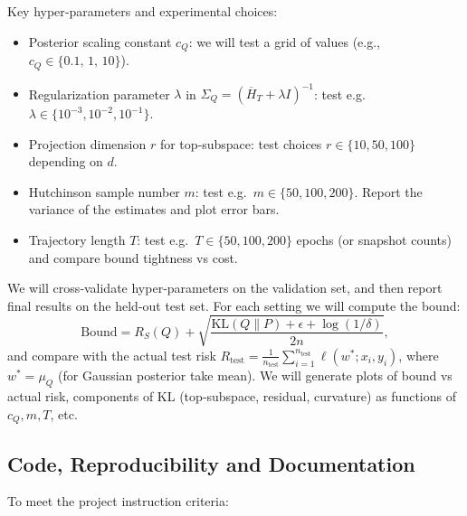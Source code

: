 Key hyper‐parameters and experimental choices:

\begin{itemize}[noitemsep]
  \item Posterior scaling constant \(c_Q\): we will test a grid of values (e.g., \(c_Q\in\{0.1,\,1,\,10\}\)).  
  \item Regularization parameter \(\lambda\) in \(\Sigma_Q=(\overline H_T+\lambda I)^{-1}\): test e.g.\ \(\lambda\in\{10^{-3},10^{-2},10^{-1}\}\).  
  \item Projection dimension \(r\) for top‐subspace: test choices \(r\in\{10,50,100\}\) depending on \(d\).  
  \item Hutchinson sample number \(m\): test e.g.\ \(m\in\{50,100,200\}\). Report the variance of the estimates and plot error bars.  
  \item Trajectory length \(T\): test e.g.\ \(T\in\{50,100,200\}\) epochs (or snapshot counts) and compare bound tightness vs cost.  
\end{itemize}

We will cross‐validate hyper‐parameters on the validation set, and then report final results on the held‐out test set. For each setting we will compute the bound:
\[
\text{Bound} = R_S(Q) + \sqrt{\frac{\mathrm{KL}(Q\|P) + \epsilon + \log(1/\delta)}{2n}},
\]
and compare with the actual test risk \(R_{\text{test}} = \frac1{n_{\text{test}}}\sum_{i=1}^{n_{\text{test}}} \ell(w^*;x_i,y_i)\), where \(w^*=\mu_Q\) (for Gaussian posterior take mean). We will generate plots of bound vs actual risk, components of KL (top‐subspace, residual, curvature) as functions of \(c_Q,m,T\), etc.

\subsection{Code, Reproducibility and Documentation}

To meet the project instruction criteria:

